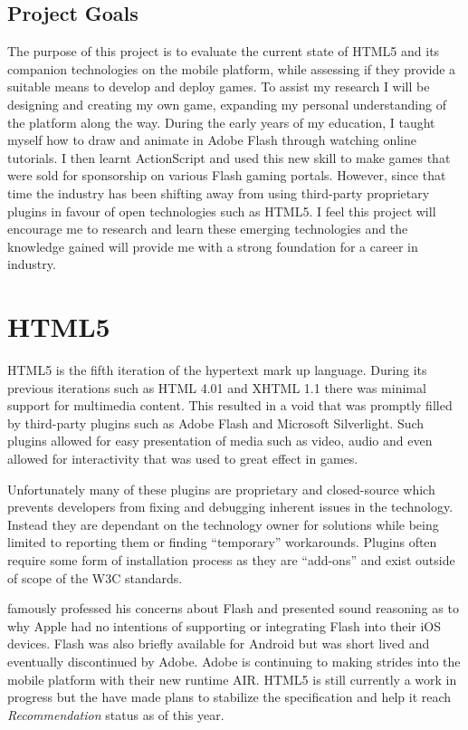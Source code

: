 \documentclass[final]{cmpreport}
\begin{document}
\subsection{Project Goals}
The purpose of this project is to evaluate the current state of HTML5 and its companion technologies on the mobile platform, while assessing if they provide a suitable means to develop and deploy games. To assist my research I will be designing and creating my own game, expanding my personal understanding of the platform along the way. During the early years of my education, I taught myself how to draw and animate in Adobe Flash through watching online tutorials. I then learnt ActionScript and used this new skill to make games that were sold for sponsorship on various Flash gaming portals. However, since that time the industry has been shifting away from using third-party proprietary plugins in favour of open technologies such as HTML5. I feel this project will encourage me to research and learn these emerging technologies and the knowledge gained will provide me with a strong foundation for a career in industry.

\section{HTML5}
HTML5 is the fifth iteration of the hypertext mark up language. During its previous iterations such as HTML 4.01 and XHTML 1.1 there was minimal support for multimedia content. This resulted in a void that was promptly filled by third-party plugins such as Adobe Flash and Microsoft Silverlight. Such plugins allowed for easy presentation of media such as video, audio and even allowed for interactivity that was used to great effect in games.

Unfortunately many of these plugins are proprietary and closed-source which prevents developers from fixing and debugging inherent issues in the technology. Instead they are dependant on the technology owner for solutions while being limited to reporting them or finding ``temporary'' workarounds. Plugins often require some form of installation process as they are ``add-ons'' and exist outside of scope of the W3C standards.

\citet{Jobs} famously professed his concerns about Flash and presented sound reasoning as to why Apple had no intentions of supporting or integrating Flash into their iOS devices. Flash was also briefly available for Android but was short lived and eventually discontinued by Adobe. Adobe is continuing to making strides into the mobile platform with their new runtime AIR\footnotemark. HTML5 is still currently a work in progress but the \cite{W3C} have made plans to stabilize the specification and help it reach \textit{Recommendation\footnotemark} status as of this year.
\end{document}
